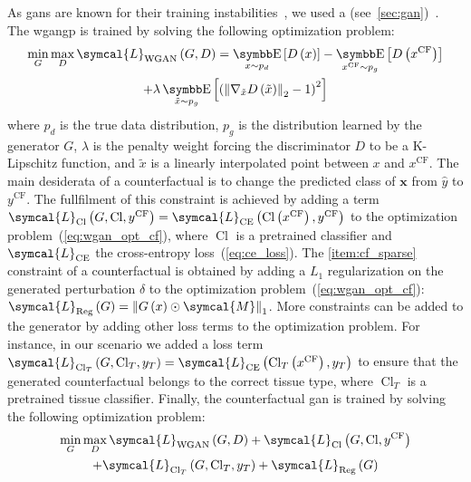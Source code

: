 \documentclass[../main.tex]{subfiles}
\begin{document}
		As \glspl{gan} are known for their training instabilities~\cite{Salimans2016ImprovedTF,Arjovsky2017TowardsPM}, we used a  (see~\cref{sec:gan})~\cite{WGANGP}.
		The \gls{wgangp} is trained by solving the following optimization problem:
		\begin{multline}
			\min_{G} \max_{D} \symcal{L}_{\text{WGAN}}\left(G,D\right) = \E_{x\sim p_{d}}\left[ D\left(x\right)\right] - \E_{x^{\text{CF}}\sim p_{g}}\left[ D\left(x^{\text{CF}}\right)\right] \\ + \lambda \E_{\tilde{x}\sim p_{g}}\left[ {\left( {\left\|\nabla_{\tilde{x}}D\left(\tilde{x}\right) \right\|}_{2} -1 \right)}^{2}\right] \label{eq:wgan_opt_cf}
		\end{multline}
		where \(p_{d}\) is the true data distribution, \(p_{g}\) is the distribution learned by the generator \(G\), \(\lambda\) is the penalty weight forcing the discriminator \(D\) to be a K-Lipschitz function, and \(\tilde{x}\) is a linearly interpolated point between \(x\) and \(x^{\text{CF}}\).
		The main desiderata of a counterfactual is to change the predicted class of \(\symbf{x}\) from \(\hat{y}\) to \(y^{\text{CF}}\).
		The fullfilment of this constraint is achieved by adding a term \(\symcal{L}_{\operatorname{Cl}}\left(G,\operatorname{Cl}, y^{\text{CF}} \right) = \symcal{L}_{\text{CE}}\left(\operatorname{Cl}\left(x^{\text{CF}}\right),y^{\text{CF}}\right) \) to the optimization problem~(\cref{eq:wgan_opt_cf}), where \(\operatorname{Cl}\) is a pretrained classifier and \(\symcal{L}_{\text{CE}}\) the cross-entropy loss~(\cref{eq:ce_loss}).
		The \ref{item:cf_sparse} constraint of a counterfactual is obtained by adding a \(L_{1}\) regularization on the generated perturbation \(\delta\) to the optimization problem~(\cref{eq:wgan_opt_cf}): \(\symcal{L}_{\text{Reg}}\left(G\right) = \left\|G\left(x\right) \odot \symcal{M}\right\|_{1}\).
		More constraints can be added to the generator by adding other loss terms to the optimization problem.
		For instance, in our scenario we added a loss term \(\symcal{L}_{\operatorname{Cl}_{T}}\left(G,\operatorname{Cl}_{T}, y_{T} \right) = \symcal{L}_{\text{CE}}\left(\operatorname{Cl}_{T}\left(x^{\text{CF}}\right),y_{T}\right)\) to ensure that the generated counterfactual belongs to the correct tissue type, where \(\operatorname{Cl}_{T}\) is a pretrained tissue classifier.
		Finally, the counterfactual \gls{gan} is trained by solving the following optimization problem:
		\begin{multline}
			\min_{G} \max_{D} \symcal{L}_{\text{WGAN}}\left(G,D\right) + \symcal{L}_{\operatorname{Cl}}\left(G,\operatorname{Cl}, y^{\text{CF}}\right)\\ + \symcal{L}_{\operatorname{Cl}_{T}}\left(G,\operatorname{Cl}_{T}, y_{T}\right) + \symcal{L}_{\text{Reg}}\left(G\right)
		\end{multline}
\end{document}
